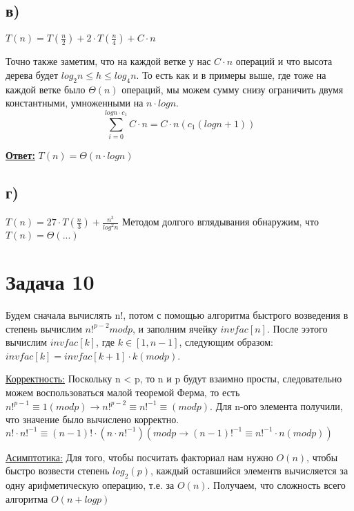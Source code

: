 \documentclass[a4paper,14pt]{article} %
\begin{document}
\subsection{в)}
$T(n) = T(\frac{n}{2}) + 2 \cdot T(\frac{n}{4}) + C \cdot n$

Точно также заметим, что на каждой ветке у нас $C \cdot n$ операций и что высота дерева будет $log_2 n \leq h \leq log_4 n$.
То есть как и в примеры выше, где тоже на каждой ветке было $\Theta(n)$ операций, мы можем сумму снизу ограничить двумя константными, умноженными на $n \cdot logn$.
\begin{equation*}
	\sum_{i = 0}^{logn \cdot c_1} C \cdot n = C \cdot n (c_1(logn + 1))
\end{equation*}

\underline{\textbf{Ответ:}} $T(n) = \Theta(n \cdot logn)$

\subsection{г)}
$T(n) = 27 \cdot T(\frac{n}{3}) + \frac{n^3}{log^2n}$
\newline
Методом долгого вглядывания обнаружим, что $T(n) = \Theta(...)$


\section{Задача 10}
Будем сначала вычислять n!, потом с помощью алгоритма быстрого возведения в степень вычислим $n!^{p - 2} mod p$, и заполним ячейку $invfac[n]$.
После ээтого вычислим $invfac[k]$, где $k \in [1, n-1]$, следующим образом: $invfac[k] = invfac[k+1] \cdot k( mod p)$.

\underline{Корректность:} Поскольку n < p, то n и p будут взаимно просты, следовательно можем воспользоваться малой теоремой Ферма,
то есть $n!^{p-1} \equiv 1 (mod p) \longrightarrow n!^{p-2} \equiv n!^{-1} \equiv (mod p)$.
Для n-ого элемента получили, что значение было вычислено корректно. $n! \cdot n!^{-1} \equiv (n-1)! \cdot (n \cdot n!^{-1}) (mod p \longrightarrow (n-1)!^{-1} \equiv n!^{-1} \cdot n(mod p))$

\underline{Асимптотика:} Для того, чтобы посчитать факториал нам нужно $O(n)$, чтобы быстро возвести  степень $log_2(p)$, каждый оставшийся элементв вычисляется за одну арифметическую операцию, т.е. за $O(n)$.
Получаем, что сложность всего алгоритма $O(n + logp)$
\end{document}
